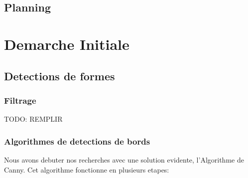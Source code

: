 \documentclass[a4paper, 12pt, titlepage, oneside]{article}
\begin{document}
	\subsection{Planning}
	\newpage
\section{Demarche Initiale}
	\subsection{Detections de formes}

	\subsubsection{Filtrage}
	{TODO: REMPLIR}
	
	\subsubsection{Algorithmes de detections de bords}
	Nous avons debuter nos recherches avec une solution evidente, l'Algorithme de Canny. Cet algorithme fonctionne en plusieurs etapes:
\end{document}
